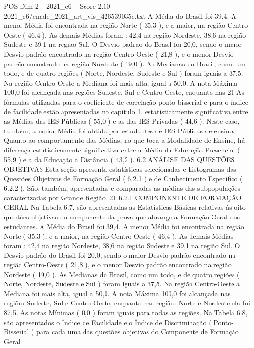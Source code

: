 \begin{textsample}{POS Dim 2 – 2021\_c6 – Score 2.00 – 2021\_c6/enade\_2021\_art\_vis\_426539035c.txt}
A Média do Brasil foi 39,4.
A menor Média foi encontrada na região Norte ( 35,3 ), e a maior, na região Centro-Oeste ( 46,4 ).
As demais Médias foram : 42,4 na região Nordeste, 38,6 na região Sudeste e 39,1 na região Sul.
O Desvio padrão do Brasil foi 20,0, sendo o maior Desvio padrão encontrado na região Centro-Oeste ( 21,8 ), e o menor Desvio padrão encontrado na região Nordeste ( 19,0 ).
As Medianas do Brasil, como um todo, e de quatro regiões ( Norte, Nordeste, Sudeste e Sul ) foram iguais a 37,5.
Na região Centro-Oeste a Mediana foi mais alta, igual a 50,0.
A nota Máxima 100,0 foi alcançada nas regiões Sudeste, Sul e Centro-Oeste, enquanto nas 21 As fórmulas utilizadas para o coeficiente de correlação ponto-bisserial e para o índice de facilidade estão apresentadas no capítulo 1. estatisticamente significativa entre as Médias das IES Públicas ( 55,0 ) e as das IES Privadas ( 44,6 ).
Neste caso, também, a maior Média foi obtida por estudantes de IES Públicas de ensino.
Quanto ao comportamento das Médias, no que toca a Modalidade de Ensino, há diferença estatisticamente significativa entre a Média da Educação Presencial ( 55,9 ) e a da Educação a Distância ( 43,2 ). 6.2 ANÁLISE DAS QUESTÕES OBJETIVAS Esta seção apresenta estatísticas selecionadas e histogramas das Questões Objetivas de Formação Geral ( 6.2.1 ) e de Conhecimento Específico ( 6.2.2 ).
São, também, apresentadas e comparadas as médias das subpopulações caracterizadas por Grande Região. 21 6.2.1 COMPONENTE DE FORMAÇÃO GERAL Na Tabela 6.7, são apresentadas as Estatísticas Básicas relativas às oito questões objetivas do componente da prova que abrange a Formação Geral dos estudantes.
A Média do Brasil foi 39,4.
A menor Média foi encontrada na região Norte ( 35,3 ), e a maior, na região Centro-Oeste ( 46,4 ).
As demais Médias foram : 42,4 na região Nordeste, 38,6 na região Sudeste e 39,1 na região Sul.
O Desvio padrão do Brasil foi 20,0, sendo o maior Desvio padrão encontrado na região Centro-Oeste ( 21,8 ), e o menor Desvio padrão encontrado na região Nordeste ( 19,0 ).
As Medianas do Brasil, como um todo, e de quatro regiões ( Norte, Nordeste, Sudeste e Sul ) foram iguais a 37,5.
Na região Centro-Oeste a Mediana foi mais alta, igual a 50,0.
A nota Máxima 100,0 foi alcançada nas regiões Sudeste, Sul e Centro-Oeste, enquanto nas regiões Norte e Nordeste ela foi 87,5.
As notas Mínimas ( 0,0 ) foram iguais para todas as regiões.
Na Tabela 6.8, são apresentados o Índice de Facilidade e o Índice de Discriminação ( Ponto-Bisserial ) para cada uma das questões objetivas do Componente de Formação Geral.

\end{textsample}
